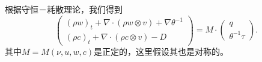 	根据守恒－耗散理论，我们得到
	\begin{equation} \label{eq:CDFgeneral  }
		\left( \begin{array}{c} 
			(\rho w)_t +  \nabla \cdot (\rho w \otimes v)  + \nabla \theta^{-1} \\
			(\rho c)_t +  \nabla \cdot (\rho c \otimes v)  - D
		\end{array} \right) = M \cdot
		\left( \begin{array}{c} 
			q \\ \theta^{-1} \tau
		\end{array}\right).
	\end{equation}
	其中$M=M(\nu,u,w,c)$是正定的，这里假设其也是对称的。


